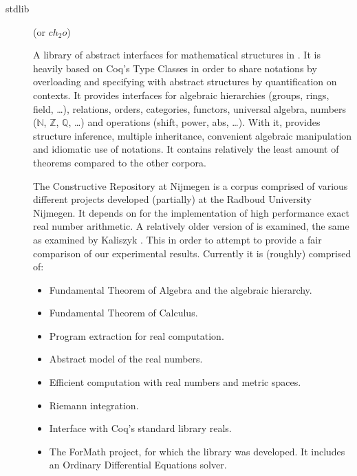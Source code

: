 \begin{description}
  \item[\coq stdlib]
  \item[\formalin]
    (or $ch_2o$)
  \item[\mathclasses] \cite{spitters2011type} \cite{krebbers2011type} \cite{krebbers2011computer}
    A library of abstract interfaces for mathematical structures in \coq.
    It is heavily based on Coq's Type Classes \cite{sozeau2008first} in order to share notations by overloading and specifying with abstract structures by quantification on contexts.
    It provides interfaces for algebraic hierarchies (groups, rings, field, \ldots),
    relations, orders, categories, functors, universal algebra,
    numbers ($\mathbb{N}$, $\mathbb{Z}$, $\mathbb{Q}$, \ldots)
    and operations (shift, power, abs, \ldots).
    With it, \mathclasses provides structure inference, multiple inheritance, convenient algebraic manipulation
    and idiomatic use of notations.
    It contains relatively the least amount of theorems compared to the other corpora.
  \item[\corn]
    The \coq Constructive Repository at Nijmegen is a corpus comprised of various different projects developed (partially) at the Radboud University Nijmegen.
    It depends on \mathclasses for the implementation of high performance exact real number arithmetic.
    A relatively older version of \corn is examined, the same as examined by Kaliszyk \cite{kaliszyk2014machine}.
    This in order to attempt to provide a fair comparison of our experimental results.
    Currently it is (roughly) comprised of:
    \begin{itemize}
      \item Fundamental Theorem of Algebra and the algebraic hierarchy. \cite{geuvers2002constructive}
      \item Fundamental Theorem of Calculus. \cite{cruz2002constructive}
      \item Program extraction for real computation. \cite{cruz2006large}
      \item Abstract model of the real numbers. \cite{niqui2008coinductive}
      \item Efficient computation with real numbers and metric spaces. \cite{o2008certified}
      \item Riemann integration. \cite{o2010computer}
      \item Interface with Coq's standard library reals. \cite{kaliszyk2008computing}
      \item The ForMath project, for which the \mathclasses library was developed. \cite{spitters2011type}
        It includes an Ordinary Differential Equations solver. \cite{makarov2013picard}
    \end{itemize}

  \item[\mathcomp]
\end{description}

